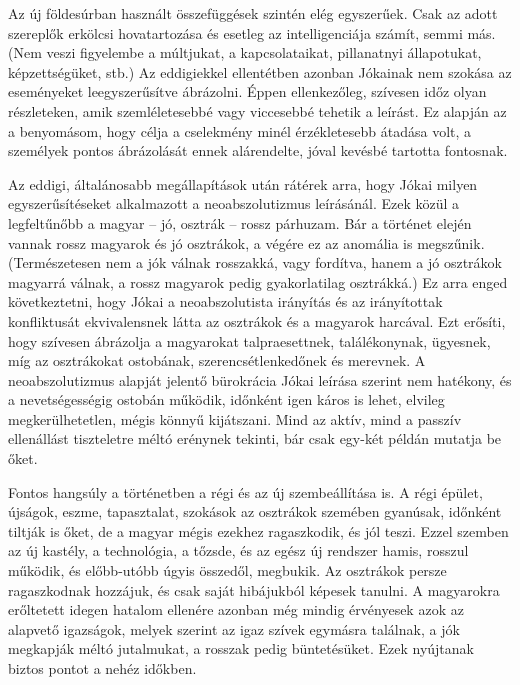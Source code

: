 \documentclass{thesis-ekf}
\begin{document}
    Az új földesúrban használt összefüggések szintén elég egyszerűek.
    Csak az adott szereplők erkölcsi hovatartozása és esetleg az intelligenciája számít, semmi más.
    (Nem veszi figyelembe a múltjukat, a kapcsolataikat, pillanatnyi állapotukat, képzettségüket, stb.)
    Az eddigiekkel ellentétben azonban Jókainak nem szokása az eseményeket leegyszerűsítve ábrázolni.
    Éppen ellenkezőleg, szívesen időz olyan részleteken, amik szemléletesebbé vagy viccesebbé tehetik a leírást.
    Ez alapján az a benyomásom, hogy célja a cselekmény minél érzékletesebb átadása volt,
        a személyek pontos ábrázolását ennek alárendelte, jóval kevésbé tartotta fontosnak.

    Az eddigi, általánosabb megállapítások után rátérek arra, hogy Jókai milyen egyszerűsítéseket alkalmazott
        a neoabszolutizmus leírásánál.
    Ezek közül a legfeltűnőbb a magyar – jó, osztrák – rossz párhuzam.
    Bár a történet elején vannak rossz magyarok és jó osztrákok, a végére ez az anomália is megszűnik.
    (Természetesen nem a jók válnak rosszakká, vagy fordítva, hanem a jó osztrákok magyarrá válnak,
        a rossz magyarok pedig gyakorlatilag osztrákká.)
    Ez arra enged következtetni, hogy Jókai a neoabszolutista irányítás és az irányítottak konfliktusát
        ekvivalensnek látta az osztrákok és a magyarok harcával.
    Ezt erősíti, hogy szívesen ábrázolja a magyarokat talpraesettnek, találékonynak, ügyesnek,
        míg az osztrákokat ostobának, szerencsétlenkedőnek és merevnek.
    A neoabszolutizmus alapját jelentő bürokrácia Jókai leírása szerint nem hatékony, és a nevetségességig
        ostobán működik, időnként igen káros is lehet, elvileg megkerülhetetlen, mégis könnyű kijátszani.
    Mind az aktív, mind a passzív ellenállást tiszteletre méltó erénynek tekinti, bár csak egy-két példán mutatja be őket.

    Fontos hangsúly a történetben a régi és az új szembeállítása is.
    A régi épület, újságok, eszme, tapasztalat, szokások az osztrákok szemében gyanúsak, időnként tiltják is őket,
        de a magyar mégis ezekhez ragaszkodik, és jól teszi.
    Ezzel szemben az új kastély, a technológia, a tőzsde, és az egész új rendszer hamis, rosszul működik,
        és előbb-utóbb úgyis összedől, megbukik.
    Az osztrákok persze ragaszkodnak hozzájuk, és csak saját hibájukból képesek tanulni.
    A magyarokra erőltetett idegen hatalom ellenére azonban még mindig érvényesek azok az alapvető igazságok,
        melyek szerint az igaz szívek egymásra találnak, a jók megkapják méltó jutalmukat, a rosszak pedig büntetésüket.
    Ezek nyújtanak biztos pontot a nehéz időkben.
\end{document}
